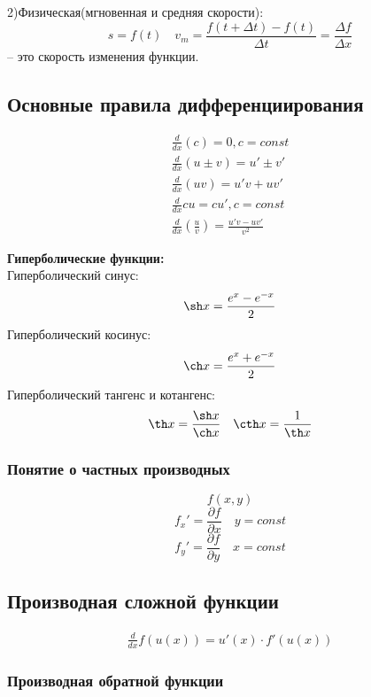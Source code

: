 \documentclass[a4paper, 12pt]{article}
\begin{document}
       
2)Физическая(мгновенная и средняя скорости):\\
\[
  s = f(t) \quad v_m = \frac{f(t + \Delta t) - f(t)}{\Delta t} = \frac{\Delta f}{\Delta x}
\]
-- это скорость изменения функции.

\subsection{Основные правила дифференциирования}

\begin{align}
  \frac{d}{dx} (c) = 0, c = const\\
  \frac{d}{dx} (u \pm v) = u' \pm v'\\
  \frac{d}{dx} (uv) = u'v+u v'\\
  \frac{d}{dx} cu = c u',c=const\\
  \frac{d}{dx} \left(\frac{u}{v}\right) = \frac{u' v - uv'}{v^2}
\end{align}

\textbf{Гиперболические функции:}\\

Гиперболический синус:\\
\[
  \sh x = \frac{e^x-e^{-x}}{2}
\]
Гиперболический косинус:\\
\[
  \ch x = \frac{e^x+e^{-x}}{2}
\]
Гиперболический тангенс и котангенс:\\
\[
  \th x = \frac{\sh x}{\ch x} \quad  \cth x = \frac{1}{\th x}
\]

\subsubsection*{Понятие о частных производных}
\[
  f(x,y)
\]
\[
  f_x' = \frac{\partial f}{\partial x} \quad y=const 
\]
\[
  f_y' = \frac{\partial f}{\partial y} \quad x=const
\]

\subsection{Производная сложной функции}

\begin{align}
  \frac{d}{dx} f(u(x)) = u'(x) \cdot f'(u(x)) 
\end{align}

\subsubsection*{Производная обратной функции}
\end{document}
